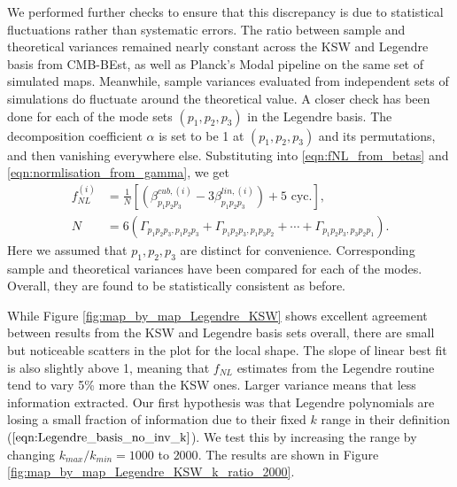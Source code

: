 We performed further checks to ensure that this discrepancy is due to statistical fluctuations rather than systematic errors. The ratio between sample and theoretical variances remained nearly constant across the KSW and Legendre basis from CMB-BEst, as well as Planck's Modal pipeline on the same set of simulated maps. Meanwhile, sample variances evaluated from independent sets of simulations do fluctuate around the theoretical value. A closer check has been done for each of the mode sets $(p_1,p_2,p_3)$ in the Legendre basis. The decomposition coefficient $\alpha$ is set to be 1 at $(p_1,p_2,p_3)$ and its permutations, and then vanishing everywhere else. Substituting into \eqref{eqn:fNL_from_betas} and \eqref{eqn:normlisation_from_gamma}, we get
\begin{align}
	f_{NL}^{(i)} &= \frac{1}{N} \left[ \left( \beta^{cub,(i)}_{p_1 p_2 p_3} - 3 \beta^{lin,(i)}_{p_1 p_2 p_3} \right) + \text{5 cyc.} \right], \\
	N &= 6\left( \Gamma_{p_1 p_2 p_3, p_1 p_2 p_3} + \Gamma_{p_1 p_2 p_3, p_1 p_3 p_2} + \cdots + \Gamma_{p_1 p_2 p_3, p_3 p_2 p_1} \right).
\end{align}
Here we assumed that $p_1,p_2,p_3$ are distinct for convenience. Corresponding sample and theoretical variances have been compared for each of the modes. Overall, they are found to be statistically consistent as before.


While Figure \ref{fig:map_by_map_Legendre_KSW} shows excellent agreement between results from the KSW and Legendre basis sets overall, there are small but noticeable scatters in the plot for the local shape. The slope of linear best fit is also slightly above 1, meaning that $f_{NL}$ estimates from the Legendre routine tend to vary 5\% more than the KSW ones. Larger variance means that less information extracted. Our first hypothesis was that Legendre polynomials are losing a small fraction of information due to their fixed $k$ range in their definition ($\ref{eqn:Legendre_basis_no_inv_k}$). We test this by increasing the range by changing $k_{max}/k_{min} = 1000$ to $2000$. The results are shown in Figure \ref{fig:map_by_map_Legendre_KSW_k_ratio_2000}.

